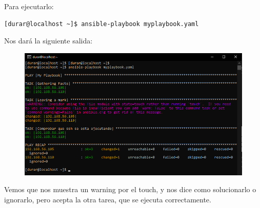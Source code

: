 \documentclass[a4paper]{article}
\begin{document}
\newline Para ejecutarlo:
\begin{lstlisting}[style=bashCentOS]
    [durar@localhost ~]$ ansible-playbook myplaybook.yaml
\end{lstlisting}
Nos dará la siguiente salida:
\begin{figure}[hbt!]
    \centering
    \includegraphics[width=\textwidth]{salida de playbook.png}
\end{figure}
\newline Vemos que nos muestra un warning por el touch, y nos dice como solucionarlo o ignorarlo, pero 
acepta la otra tarea, que se ejecuta correctamente.
\newpage
\end{document}
